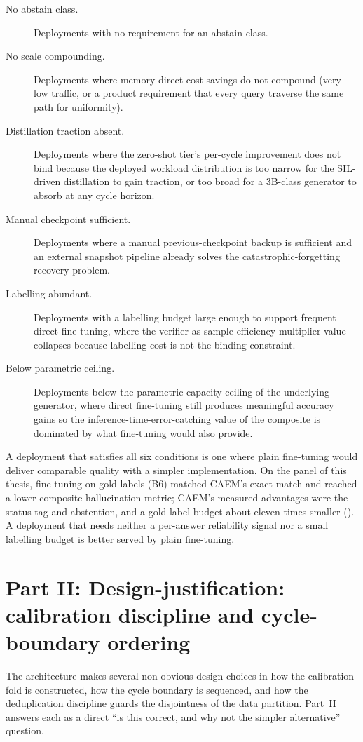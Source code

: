 \begin{description}
\item[No abstain class.] Deployments with no requirement for an abstain class.
\item[No scale compounding.] Deployments where memory-direct cost savings do not compound (very low traffic, or a product requirement that every query traverse the same path for uniformity).
\item[Distillation traction absent.] Deployments where the zero-shot tier's per-cycle improvement does not bind because the deployed workload distribution is too narrow for the SIL-driven distillation to gain traction, or too broad for a 3B-class generator to absorb at any cycle horizon.
\item[Manual checkpoint sufficient.] Deployments where a manual previous-checkpoint backup is sufficient and an external snapshot pipeline already solves the catastrophic-forgetting recovery problem.
\item[Labelling abundant.] Deployments with a labelling budget large enough to support frequent direct fine-tuning, where the verifier-as-sample-efficiency-multiplier value collapses because labelling cost is not the binding constraint.
\item[Below parametric ceiling.] Deployments below the parametric-capacity ceiling of the underlying generator, where direct fine-tuning still produces meaningful accuracy gains so the inference-time-error-catching value of the composite is dominated by what fine-tuning would also provide.
\end{description}

A deployment that satisfies all six conditions is one where plain fine-tuning would deliver comparable quality with a simpler implementation. On the panel of this thesis, fine-tuning on gold labels (B6) matched CAEM's exact match and reached a lower composite hallucination metric; CAEM's measured advantages were the status tag and abstention, and a gold-label budget about eleven times smaller (). A deployment that needs neither a per-answer reliability signal nor a small labelling budget is better served by plain fine-tuning.

\part*{Part II: Design-justification: calibration discipline and cycle-boundary ordering}

The architecture makes several non-obvious design choices in how the calibration fold is constructed, how the cycle boundary is sequenced, and how the deduplication discipline guards the disjointness of the data partition. Part~II answers each as a direct ``is this correct, and why not the simpler alternative'' question.

